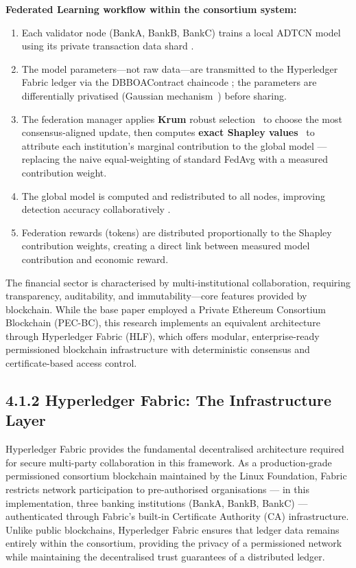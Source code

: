 \medskip
\textbf{Federated Learning workflow within the consortium system:}
\begin{enumerate}
    \item Each validator node (BankA, BankB, BankC) trains a local ADTCN model using its private transaction data shard \cite{10746050}.
    \item The model parameters—not raw data—are transmitted to the Hyperledger Fabric ledger via the DBBOAContract chaincode \cite{9945966}; the parameters are differentially privatised (Gaussian mechanism~\cite{dwork2006}) before sharing.
    \item The federation manager applies \textbf{Krum} robust selection~\cite{blanchard2017} to choose the most consensus-aligned update, then computes \textbf{exact Shapley values}~\cite{wang2020fedsv} to attribute each institution's marginal contribution to the global model — replacing the naive equal-weighting of standard FedAvg with a measured contribution weight.
    \item The global model is computed and redistributed to all nodes, improving detection accuracy collaboratively \cite{10746050}.
    \item Federation rewards (tokens) are distributed proportionally to the Shapley contribution weights, creating a direct link between measured model contribution and economic reward.
\end{enumerate}

The financial sector is characterised by multi-institutional collaboration, requiring transparency, auditability, and immutability—core features provided by blockchain. While the base paper employed a Private Ethereum Consortium Blockchain (PEC-BC), this research implements an equivalent architecture through Hyperledger Fabric (HLF), which offers modular, enterprise-ready permissioned blockchain infrastructure with deterministic consensus and certificate-based access control.

\subsection*{4.1.2 Hyperledger Fabric: The Infrastructure Layer}

Hyperledger Fabric provides the fundamental decentralised architecture required for secure multi-party collaboration in this framework. As a production-grade permissioned consortium blockchain maintained by the Linux Foundation, Fabric restricts network participation to pre-authorised organisations — in this implementation, three banking institutions (BankA, BankB, BankC) — authenticated through Fabric's built-in Certificate Authority (CA) infrastructure. Unlike public blockchains, Hyperledger Fabric ensures that ledger data remains entirely within the consortium, providing the privacy of a permissioned network while maintaining the decentralised trust guarantees of a distributed ledger.

